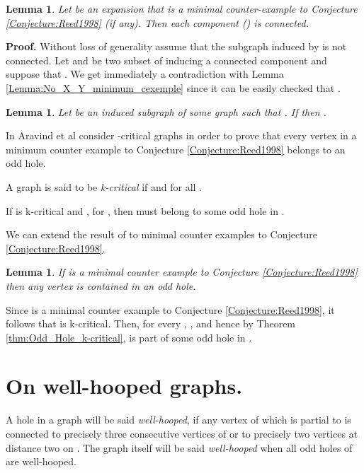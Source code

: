 \documentclass{amsart}
\newtheorem{lem}[thm]{Lemma}
\theoremstyle{definition}
\theoremstyle{remark}
\newenvironment{prf}{{\bf \noindent Proof. } }{\hfill\\}
\newcommand{\Wh}{well-hooped\xspace}
\begin{document}
\begin{lem}\label{Lemma:Connected_component_expansion_minimum_cexemple}
Let  be an  expansion that is a minimal counter-example to Conjecture \ref{Conjecture:Reed1998} (if any). Then each component  () is connected.
\end{lem}
\begin{prf} Without loss of generality assume that the subgraph induced by  is not connected. Let  and  be two subset of  inducing a connected component and suppose that . We get immediately a contradiction with Lemma \ref{Lemma:No_X_Y_minimum_cexemple} since it can be easily checked that .
\end{prf}


\begin{lem}\label{Lemma:ReedPourSousGrapheQuiAtteintLeChromaticNumber}
 Let  be an induced subgraph of some graph  such that  .
If  then .
\end{lem}

In \cite{AraKarSub2011} Aravind et al consider -critical graphs in order to prove that every vertex in a minimum counter example to Conjecture \ref{Conjecture:Reed1998} belongs to an odd hole.

A graph  is said to be {\em k-critical} if  and  for all .

\begin{thm}\cite{AraKarSub2011}\label{thm:Odd_Hole_k-critical}
If  is k-critical and , for , then  must belong to some odd hole in .
\end{thm}

We can extend the result of \cite{AraKarSub2011} to minimal counter examples to Conjecture \ref{Conjecture:Reed1998}.
\begin{lem} \label{Lemme:Hole} 
If  is a minimal counter example to Conjecture \ref{Conjecture:Reed1998} then any vertex is contained in an odd hole.
\end{lem}
\begin{prf}
 Since  is a minimal counter example to Conjecture \ref{Conjecture:Reed1998}, it follows that  is k-critical. Then, for every , , 
and hence by Theorem \ref{thm:Odd_Hole_k-critical},  is part of some odd hole in .
\end{prf}


\section{On \Wh graphs.}


A hole in a graph  will be said {\em \Wh}, if any vertex of  which is partial to  is connected to precisely three consecutive vertices of  or to  precisely two vertices at distance two on . The graph  itself 
will be said {\em \Wh} when all odd holes of  are \Wh.
\end{document}

